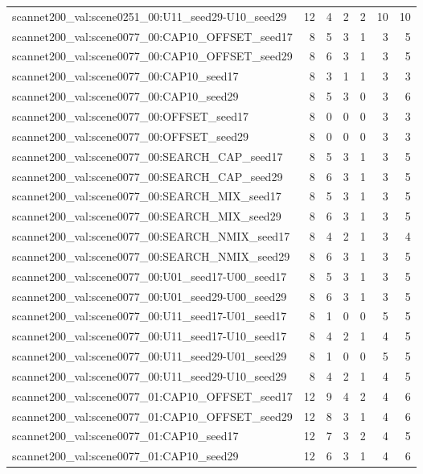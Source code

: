 \begin{table}[t]
\begin{tabular}{lrrrrrr}
scannet200\_val:scene0251\_00:U11\_seed29-U10\_seed29 & 12 & 4 & 2 & 2 & 10 & 10 \\
scannet200\_val:scene0077\_00:CAP10\_OFFSET\_seed17 & 8 & 5 & 3 & 1 & 3 & 5 \\
scannet200\_val:scene0077\_00:CAP10\_OFFSET\_seed29 & 8 & 6 & 3 & 1 & 3 & 5 \\
scannet200\_val:scene0077\_00:CAP10\_seed17 & 8 & 3 & 1 & 1 & 3 & 3 \\
scannet200\_val:scene0077\_00:CAP10\_seed29 & 8 & 5 & 3 & 0 & 3 & 6 \\
scannet200\_val:scene0077\_00:OFFSET\_seed17 & 8 & 0 & 0 & 0 & 3 & 3 \\
scannet200\_val:scene0077\_00:OFFSET\_seed29 & 8 & 0 & 0 & 0 & 3 & 3 \\
scannet200\_val:scene0077\_00:SEARCH\_CAP\_seed17 & 8 & 5 & 3 & 1 & 3 & 5 \\
scannet200\_val:scene0077\_00:SEARCH\_CAP\_seed29 & 8 & 6 & 3 & 1 & 3 & 5 \\
scannet200\_val:scene0077\_00:SEARCH\_MIX\_seed17 & 8 & 5 & 3 & 1 & 3 & 5 \\
scannet200\_val:scene0077\_00:SEARCH\_MIX\_seed29 & 8 & 6 & 3 & 1 & 3 & 5 \\
scannet200\_val:scene0077\_00:SEARCH\_NMIX\_seed17 & 8 & 4 & 2 & 1 & 3 & 4 \\
scannet200\_val:scene0077\_00:SEARCH\_NMIX\_seed29 & 8 & 6 & 3 & 1 & 3 & 5 \\
scannet200\_val:scene0077\_00:U01\_seed17-U00\_seed17 & 8 & 5 & 3 & 1 & 3 & 5 \\
scannet200\_val:scene0077\_00:U01\_seed29-U00\_seed29 & 8 & 6 & 3 & 1 & 3 & 5 \\
scannet200\_val:scene0077\_00:U11\_seed17-U01\_seed17 & 8 & 1 & 0 & 0 & 5 & 5 \\
scannet200\_val:scene0077\_00:U11\_seed17-U10\_seed17 & 8 & 4 & 2 & 1 & 4 & 5 \\
scannet200\_val:scene0077\_00:U11\_seed29-U01\_seed29 & 8 & 1 & 0 & 0 & 5 & 5 \\
scannet200\_val:scene0077\_00:U11\_seed29-U10\_seed29 & 8 & 4 & 2 & 1 & 4 & 5 \\
scannet200\_val:scene0077\_01:CAP10\_OFFSET\_seed17 & 12 & 9 & 4 & 2 & 4 & 6 \\
scannet200\_val:scene0077\_01:CAP10\_OFFSET\_seed29 & 12 & 8 & 3 & 1 & 4 & 6 \\
scannet200\_val:scene0077\_01:CAP10\_seed17 & 12 & 7 & 3 & 2 & 4 & 5 \\
scannet200\_val:scene0077\_01:CAP10\_seed29 & 12 & 6 & 3 & 1 & 4 & 6 \\

\end{tabular}
\end{table}
